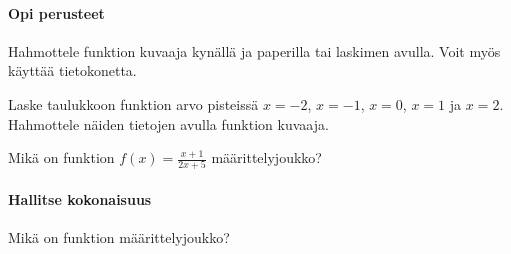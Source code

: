 \begin{tehtavasivu}

\paragraph*{Opi perusteet}

\begin{tehtava}
Hahmottele funktion kuvaaja kynällä ja paperilla tai laskimen avulla. Voit myös käyttää tietokonetta.
\begin{alakohdat}
\end{alakohdat}

\end{tehtava}

\begin{tehtava}
  Laske taulukkoon funktion arvo pisteissä $x=-2$, $x=-1$, $x=0$, $x=1$ ja $x=2$. Hahmottele näiden tietojen avulla funktion kuvaaja.
  \begin{alakohdat}
  \end{alakohdat}

  \begin{vastaus}
    \begin{alakohdat}
    \end{alakohdat}
  \end{vastaus}
\end{tehtava}

\begin{tehtava}
  Mikä on funktion $f(x)=\frac{x+1}{2x+5}$ määrittelyjoukko?

  \begin{vastaus}
    
  \end{vastaus}
\end{tehtava}

\paragraph*{Hallitse kokonaisuus}

\begin{tehtava}
  Mikä on funktion määrittelyjoukko?
  \begin{alakohdat}
  \end{alakohdat}


\end{tehtava}
\end{tehtavasivu}
